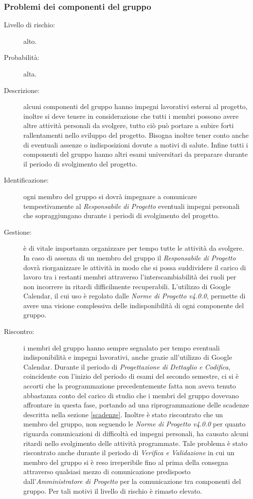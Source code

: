 \subsubsection{Problemi dei componenti del gruppo}
\begin{description}
	\item[Livello di rischio:] alto.
	\item[Probabilità:] alta.
	\item[Descrizione:] alcuni componenti del gruppo hanno impegni lavorativi esterni al progetto, inoltre si deve tenere in considerazione che tutti i membri possono avere altre attività personali da svolgere, tutto ciò può portare a subire forti rallentamenti nello sviluppo del progetto. Bisogna inoltre tener conto anche di eventuali assenze o indisposizioni dovute a motivi di salute. Infine tutti i componenti del gruppo hanno altri esami universitari da preparare durante il periodo di svolgimento del progetto.
	\item[Identificazione:] ogni membro del gruppo si dovrà impegnare a comunicare tempestivamente al \textit{Responsabile di Progetto} eventuali impegni personali che sopraggiungano durante i periodi di svolgimento del progetto. 
	\item[Gestione:] è di vitale importanza organizzare per tempo tutte le attività da svolgere. In caso di assenza di un membro del gruppo il \textit{Responsabile di Progetto} dovrà riorganizzare le attività in modo che si possa suddividere il carico di lavoro tra i restanti membri attraverso l'interscambiabilità dei ruoli per non incorrere in ritardi difficilmente recuperabili. L'utilizzo di \gls{Google Calendar}, il cui uso è regolato dalle \textit{Norme di Progetto v4.0.0}, permette di avere una visione complessiva delle indisponibilità di ogni componente del gruppo. 
	\item[Riscontro:] i membri del gruppo hanno sempre segnalato per tempo eventuali indisponibilità e impegni lavorativi, anche grazie all'utilizzo di \gls{Google Calendar}. Durante il periodo di \textit{Progettazione di Dettaglio e Codifica}, coincidente con l'inizio del periodo di esami del secondo semestre, ci si è accorti che la programmazione precedentemente fatta non aveva tenuto abbastanza conto del carico di studio che i membri del gruppo dovevano affrontare in questa fase, portando ad una riprogrammazione delle scadenze descritta nella sezione \ref{scadenze}. Inoltre è stato riscontrato che un membro del gruppo, non seguendo le \textit{Norme di Progetto v4.0.0} per quanto riguarda comunicazioni di difficoltà ed impegni personali, ha causato alcuni ritardi nello svolgimento delle attività programmate. Tale problema è stato riscontrato anche durante il periodo di \textit{Verifica e Validazione} in cui un membro del gruppo si è reso irreperibile fino al prima della consegna attraverso qualsiasi mezzo di comunicazione predisposto dall'\textit{Amministratore di Progetto} per la comunicazione tra componenti del gruppo. Per tali motivi il livello di rischio è rimasto elevato.
\end{description}
